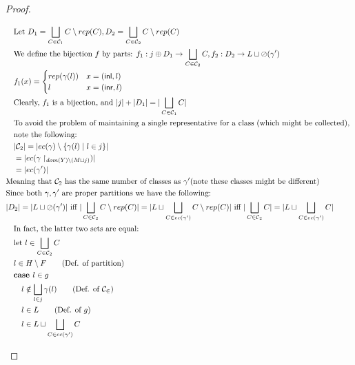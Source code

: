 \documentclass[11pt]{article}
\newcommand{\ms}[1]{\ensuremath{\mathsf{#1}}}
\newcommand{\oh}[1]{\oslash(#1)}
\theoremstyle{definition}
\begin{document}
\begin{proof}
\begin{description}
\begin{align*}
		&\quad \text{Let } D_1 = \bigsqcup_{C  \in \mathcal{C}_1} C \setminus rep(C), 
		D_2 = \bigsqcup_{C  \in \mathcal{C}_2} C \setminus rep(C)\\
		&\quad \text{We define the bijection } 
			f \text{ by parts: } 
			f_1 : j \oplus D_1 \to \bigsqcup_{C \in \mathcal{C}_2} C, f_2 : D_2 \to L \sqcup \oh{\gamma'}\\
		&\quad f_1(x) =  
		\begin{cases}
			rep(\gamma(l)) &x = (\ms{inl},l)\\
			l &x = (\ms{inr},l)
		\end{cases}\\
		&\quad \text{Clearly, } f_1 \text{ is a bijection, and } |j| + |D_1| = |\bigsqcup_{C \in \mathcal{C}_1} C|\\
		&\quad \text{To avoid the problem of maintaining a single representative for a class (which might be 
		collected), }\\
		&\quad \text{note the following: }\\
		&\quad |\mathcal{C}_2| = |ec(\gamma) \setminus \{\gamma(l) \mid l \in j\}|\\
		&\quad = |ec(\gamma \restriction_{dom(Y) \setminus (M \sqcup j)})|\\
		&\quad = |ec(\gamma')|\\
		&\text{Meaning that } \mathcal{C}_2 \text{ has the same number of classes as } \gamma' 
			\text{(note these classes might be different)}\\
		&\text{Since both } \gamma,\gamma' \text{ are proper partitions we have the following: }\\
		&|D_2| = |L \sqcup \oh{\gamma'}| \text{ iff } 
			|\bigsqcup_{C  \in \mathcal{C}_2} C \setminus rep(C)| =
			|L \sqcup \bigsqcup_{C \in ec(\gamma')} C \setminus rep(C)|
			\text{ iff }
		|\bigsqcup_{C  \in \mathcal{C}_2} C| = |L \sqcup \bigsqcup_{C \in ec(\gamma')} C|\\ 
		&\quad \text{In fact, the latter two sets are equal: }\\
		&\quad \text{let } l \in \bigsqcup_{C  \in \mathcal{C}_2} C\\
		&\quad l \in H \setminus F \tag{Def. of partition}\\
		&\quad \textbf{case } l \in g\\
		&\quad\quad l \notin \bigsqcup_{l \in j} \gamma(l) \tag{Def. of $\mathcal{C_2}$}\\
		&\quad\quad l \in L \tag{Def. of $g$}\\
		&\quad\quad l \in L \sqcup \bigsqcup_{C \in ec(\gamma')} C\\

\end{align*}
\end{description}
\end{proof}
\end{document}
